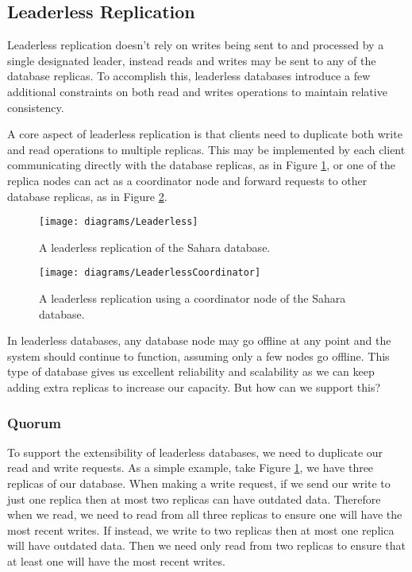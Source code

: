 \subsection{Leaderless Replication}

Leaderless replication doesn't rely on writes being sent to and processed by a single designated leader, instead reads and writes may be sent to any of the database replicas.
To accomplish this, leaderless databases introduce a few additional constraints on both read and writes operations to maintain relative consistency.

A core aspect of leaderless replication is that clients need to duplicate both write and read operations to multiple replicas.
This may be implemented by each client communicating directly with the database replicas,
as in Figure \ref{fig:sahara-leaderless},
or one of the replica nodes can act as a coordinator node and forward requests to other database replicas,
as in Figure \ref{fig:sahara-leaderless-coordinator}.

\begin{figure}[ht]
    \begin{center}
    \texttt{[image: diagrams/Leaderless]}
    \end{center}
    \caption{A leaderless replication of the Sahara database.}
    \label{fig:sahara-leaderless}
\end{figure}

\begin{figure}[ht]
    \begin{center}
    \texttt{[image: diagrams/LeaderlessCoordinator]}
    \end{center}
    \caption{A leaderless replication using a coordinator node of the Sahara database.}
    \label{fig:sahara-leaderless-coordinator}
\end{figure}

In leaderless databases,
any database node may go offline at any point and the system should continue to function, assuming only a few nodes go offline.
This type of database gives us excellent reliability and scalability as we can keep adding extra replicas to increase our capacity.
But how can we support this?

\subsubsection*{Quorum}

To support the extensibility of leaderless databases,
we need to duplicate our read and write requests.
As a simple example,
take Figure \ref{fig:sahara-leaderless},
we have three replicas of our database.
When making a write request,
if we send our write to just one replica then at most two replicas can have outdated data.
Therefore when we read, we need to read from all three replicas to ensure one will have the most recent writes.
If instead,
we write to two replicas then at most one replica will have outdated data.
Then we need only read from two replicas to ensure that at least one will have the most recent writes.

